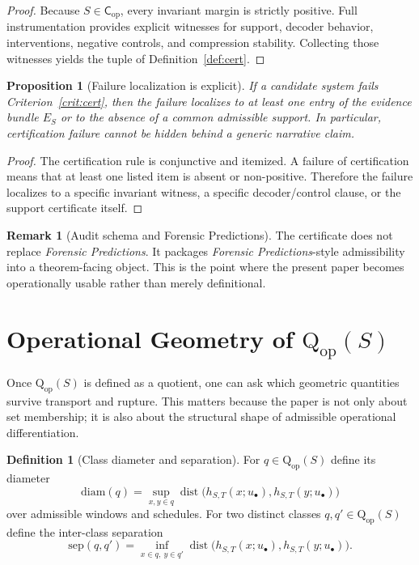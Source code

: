 \documentclass[11pt,a4paper]{article}
\newtheorem{proposition}[theorem]{Proposition}
\theoremstyle{definition}
\newtheorem{definition}[theorem]{Definition}
\newtheorem{remark}[theorem]{Remark}
\newcommand{\Cop}{\mathsf{C}_{\mathrm{op}}}
\newcommand{\Qop}{\mathrm{Q}_{\mathrm{op}}}
\newcommand{\dist}{\operatorname{dist}}
\begin{document}
\begin{proof}
Because $S \in \Cop$, every invariant margin is strictly positive. Full instrumentation provides explicit witnesses for support, decoder behavior, interventions, negative controls, and compression stability. Collecting those witnesses yields the tuple of Definition~\ref{def:cert}.
\end{proof}

\begin{proposition}[Failure localization is explicit]\label{prop:cert-local}
If a candidate system fails Criterion~\ref{crit:cert}, then the failure localizes to at least one entry of the evidence bundle $E_S$ or to the absence of a common admissible support. In particular, certification failure cannot be hidden behind a generic narrative claim.
\end{proposition}

\begin{proof}
The certification rule is conjunctive and itemized. A failure of certification means that at least one listed item is absent or non-positive. Therefore the failure localizes to a specific invariant witness, a specific decoder/control clause, or the support certificate itself.
\end{proof}

\begin{remark}[Audit schema and Forensic Predictions]
The certificate does not replace \textit{Forensic Predictions}. It packages \textit{Forensic Predictions}-style admissibility into a theorem-facing object. This is the point where the present paper becomes operationally usable rather than merely definitional.
\end{remark}
\section{\texorpdfstring{Operational Geometry of $\Qop(S)$}{Operational Geometry of Qop(S)}}
Once $\Qop(S)$ is defined as a quotient, one can ask which geometric quantities survive transport and rupture. This matters because the paper is not only about set membership; it is also about the structural shape of admissible operational differentiation.

\begin{definition}[Class diameter and separation]\label{def:geometry}
For $q \in \Qop(S)$ define its diameter
\[
\mathrm{diam}(q) = \sup_{x,y \in q} \dist\bigl(h_{S,T}(x;u_\bullet), h_{S,T}(y;u_\bullet)\bigr)
\]
over admissible windows and schedules. For two distinct classes $q,q' \in \Qop(S)$ define the inter-class separation
\[
\mathrm{sep}(q,q') = \inf_{x \in q,\ y \in q'} \dist\bigl(h_{S,T}(x;u_\bullet), h_{S,T}(y;u_\bullet)\bigr).
\]
\end{definition}
\end{document}
